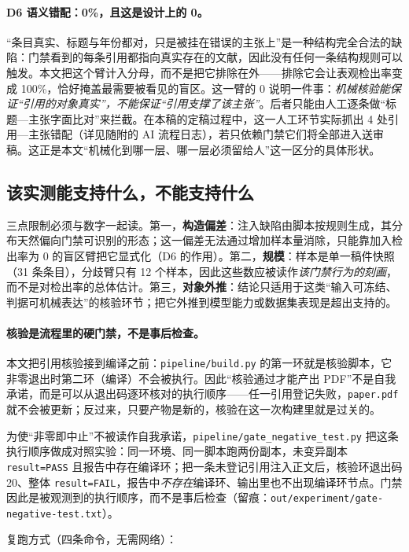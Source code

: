 \paragraph{D6 语义错配：0\%，且这是设计上的 0。}“条目真实、标题与年份都对，只是被挂在错误的主张上”是一种结构完全合法的缺陷：门禁看到的每条引用都指向真实存在的文献，因此没有任何一条结构规则可以触发。本文把这个臂计入分母，而不是把它排除在外——排除它会让表观检出率变成 100\%，恰好掩盖最需要被看见的盲区。这一臂的 0 说明一件事：\emph{机械核验能保证“引用的对象真实”，不能保证“引用支撑了该主张”}。后者只能由人工逐条做“标题—主张字面比对”来拦截。在本稿的定稿过程中，这一人工环节实际抓出 4 处引用—主张错配（详见随附的 AI 流程日志），若只依赖门禁它们将全部进入送审稿。这正是本文“机械化到哪一层、哪一层必须留给人”这一区分的具体形状。

\subsection{该实测能支持什么，不能支持什么}

三点限制必须与数字一起读。第一，\textbf{构造偏差}：注入缺陷由脚本按规则生成，其分布天然偏向门禁可识别的形态；这一偏差无法通过增加样本量消除，只能靠加入检出率为 0 的盲区臂把它显式化（D6 的作用）。第二，\textbf{规模}：样本是单一稿件快照（31 条条目），分歧臂只有 12 个样本，因此这些数应被读作\emph{该门禁行为的刻画}，而不是对检出率的总体估计。第三，\textbf{对象外推}：结论只适用于这类“输入可冻结、判据可机械表达”的核验环节；把它外推到模型能力或数据集表现是超出支持的。

\paragraph{核验是流程里的硬门禁，不是事后检查。}本文把引用核验接到编译之前：\texttt{pipeline/build.py} 的第一环就是核验脚本，它非零退出时第二环（编译）不会被执行。因此“核验通过才能产出 PDF”不是自我承诺，而是可以从退出码逐环核对的执行顺序——任一引用登记失败，\texttt{paper.pdf} 就不会被更新；反过来，只要产物是新的，核验在这一次构建里就是过关的。

为使“非零即中止”不被读作自我承诺，\texttt{pipeline/gate\_negative\_test.py} 把这条执行顺序做成对照实验：同一环境、同一脚本跑两份副本，未变异副本 \texttt{result=PASS} 且报告中存在编译环；把一条未登记引用注入正文后，核验环退出码 20、整体 \texttt{result=FAIL}，报告中\emph{不存在}编译环、输出里也不出现编译环节点。门禁因此是被观测到的执行顺序，而不是事后检查（留痕：\texttt{out/experiment/gate-negative-test.txt}）。

复跑方式（四条命令，无需网络）：

